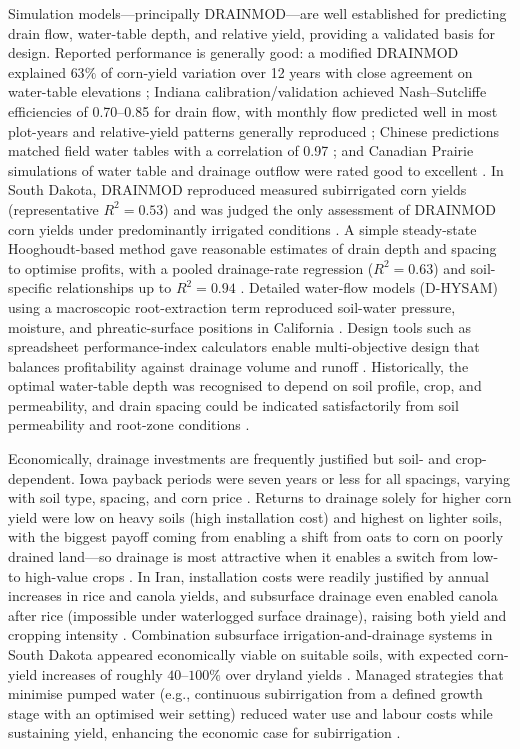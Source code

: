 \documentclass[11pt]{article}
\begin{document}
Simulation models—principally DRAINMOD—are well established for predicting drain flow, water-table depth, and relative yield, providing a validated basis for design. Reported performance is generally good: a modified DRAINMOD explained \(63\%\) of corn-yield variation over 12 years with close agreement on water-table elevations \parencite{HARDJOAMIDJOJO1982}; Indiana calibration/validation achieved Nash--Sutcliffe efficiencies of 0.70--0.85 for drain flow, with monthly flow predicted well in most plot-years and relative-yield patterns generally reproduced \parencite{Ale2009,Wang2006b}; Chinese predictions matched field water tables with a correlation of 0.97 \parencite{Li2018}; and Canadian Prairie simulations of water table and drainage outflow were rated good to excellent \parencite{Cordeiro2015}. In South Dakota, DRAINMOD reproduced measured subirrigated corn yields (representative \(R^{2}=0.53\)) and was judged the only assessment of DRAINMOD corn yields under predominantly irrigated conditions \parencite{DeBoer2006}. A simple steady-state Hooghoudt-based method gave reasonable estimates of drain depth and spacing to optimise profits, with a pooled drainage-rate regression (\(R^{2}=0.63\)) and soil-specific relationships up to \(R^{2}=0.94\) \parencite{Skaggs2006}. Detailed water-flow models (D-HYSAM) using a macroscopic root-extraction term reproduced soil-water pressure, moisture, and phreatic-surface positions in California \parencite{KARAJEH1994,KARAJEH1994b}. Design tools such as spreadsheet performance-index calculators enable multi-objective design that balances profitability against drainage volume and runoff \parencite{Sands2015}. Historically, the optimal water-table depth was recognised to depend on soil profile, crop, and permeability, and drain spacing could be indicated satisfactorily from soil permeability and root-zone conditions \parencite{HOOGHOUDT1952}.

Economically, drainage investments are frequently justified but soil- and crop-dependent. Iowa payback periods were seven years or less for all spacings, varying with soil type, spacing, and corn price \parencite{Arora2024}. Returns to drainage solely for higher corn yield were low on heavy soils (high installation cost) and highest on lighter soils, with the biggest payoff coming from enabling a shift from oats to corn on poorly drained land—so drainage is most attractive when it enables a switch from low- to high-value crops \parencite{JORJANI1991}. In Iran, installation costs were readily justified by annual increases in rice and canola yields, and subsurface drainage even enabled canola after rice (impossible under waterlogged surface drainage), raising both yield and cropping intensity \parencite{DarziNaftchali2014}. Combination subsurface irrigation-and-drainage systems in South Dakota appeared economically viable on suitable soils, with expected corn-yield increases of roughly \(40\textrm{--}100\%\) over dryland yields \parencite{DeBoer2006}. Managed strategies that minimise pumped water (e.g., continuous subirrigation from a defined growth stage with an optimised weir setting) reduced water use and labour costs while sustaining yield, enhancing the economic case for subirrigation \parencite{Ale2009,Gunn2019}.
\end{document}
